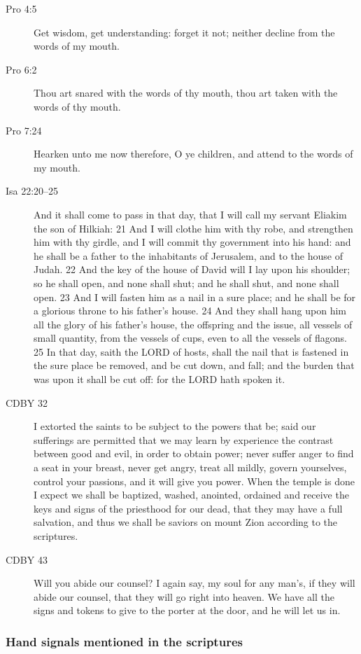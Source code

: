 \begin{description}
		\item[Pro 4:5] Get wisdom, get understanding: forget it not; neither decline from the words of my mouth.
		\item[Pro 6:2] Thou art snared with the words of thy mouth, thou art taken with the words of thy mouth.
		\item[Pro 7:24] Hearken unto me now therefore, O ye children, and attend to the words of my mouth.
		\item[Isa 22:20--25] And it shall come to pass in that day, that I will call my servant Eliakim the son of Hilkiah: 21 And I will clothe him with thy robe, and strengthen him with thy girdle, and I will commit thy government into his hand: and he shall be a father to the inhabitants of Jerusalem, and to the house of Judah. 22 And the key of the house of David will I lay upon his shoulder; so he shall open, and none shall shut; and he shall shut, and none shall open. 23 And I will fasten him as a nail in a sure place; and he shall be for a glorious throne to his father's house. 24 And they shall hang upon him all the glory of his father's house, the offspring and the issue, all vessels of small quantity, from the vessels of cups, even to all the vessels of flagons. 25 In that day, saith the LORD of hosts, shall the nail that is fastened in the sure place be removed, and be cut down, and fall; and the burden that was upon it shall be cut off: for the LORD hath spoken it.
		\item[CDBY 32] I extorted the saints to be subject to the powers that be; said our sufferings are permitted that we may learn by experience the contrast between good and evil, in order to obtain power; never suffer anger to find a seat in your breast, never get angry, treat all mildly, govern yourselves, control your passions, and it will give you power. When the temple is done I expect we shall be baptized, washed, anointed, ordained and receive the keys and signs of the priesthood for our dead, that they may have a full salvation, and thus we shall be saviors on mount Zion according to the scriptures.
		\item[CDBY 43] Will you abide our counsel? I again say, my soul for any man's, if they will abide our counsel, that they will go right into heaven. We have all the signs and tokens to give to the porter at the door, and he will let us in.
		\end{description}

		\subsubsection{Hand signals mentioned in the scriptures} %

